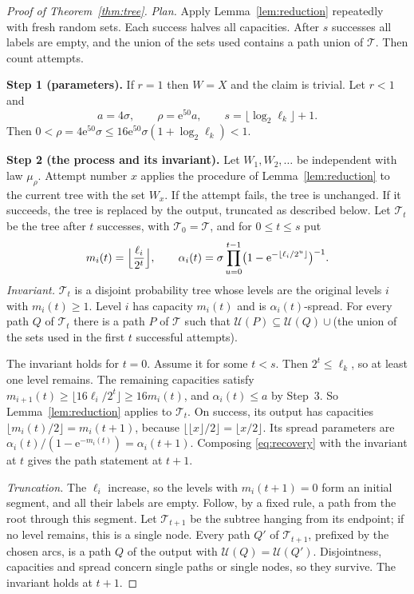 \documentclass[11pt]{article}
\numberwithin{equation}{section}
\newcommand{\TT}{\mathcal T}
\newcommand{\UU}{\mathcal U}
\newcommand{\ee}{\mathrm e}
\newcommand{\Step}[1]{\par\smallskip\noindent\textbf{Step #1.}}
\begin{document}
\begin{proof}[Proof of Theorem~\ref{thm:tree}]
\emph{Plan.} Apply Lemma~\ref{lem:reduction} repeatedly with fresh random sets.
Each success halves all capacities. After $s$ successes all labels are empty,
and the union of the sets used contains a path union of $\TT$. Then count
attempts.

\Step{1 (parameters)} If $r=1$ then $W=X$ and the claim is trivial. Let $r<1$ and
\[
 a=4\sigma,\qquad \rho=\ee^{50}a,\qquad s=\lfloor\log_2\ell_k\rfloor+1 .
\]
Then $0<\rho=4\ee^{50}\sigma\le16\ee^{50}\sigma(1+\log_2\ell_k)<1$.

\Step{2 (the process and its invariant)} Let $W_1,W_2,\ldots$ be independent
with law $\mu_\rho$. Attempt number $x$ applies the procedure of
Lemma~\ref{lem:reduction} to the current tree with the set $W_x$. If the
attempt fails, the tree is unchanged. If it succeeds, the tree is replaced by
the output, truncated as described below. Let $\TT_t$ be the tree after $t$
successes, with $\TT_0=\TT$, and for $0\le t\le s$ put
\begin{equation}\label{eq:capacities}
 m_i(t)=\Bigl\lfloor\frac{\ell_i}{2^t}\Bigr\rfloor,\qquad
 \alpha_i(t)=\sigma\prod_{u=0}^{t-1}
 \bigl(1-\ee^{-\lfloor\ell_i/2^u\rfloor}\bigr)^{-1}.
\end{equation}
\emph{Invariant.} $\TT_t$ is a disjoint probability tree whose levels are the
original levels $i$ with $m_i(t)\ge1$. Level $i$ has capacity $m_i(t)$ and is
$\alpha_i(t)$-spread. For every path $Q$ of $\TT_t$ there is a path $P$ of
$\TT$ such that $\UU(P)\subseteq\UU(Q)\cup{}$(the union of the sets used in the
first $t$ successful attempts).

The invariant holds for $t=0$. Assume it for some $t<s$. Then $2^t\le\ell_k$,
so at least one level remains. The remaining capacities satisfy
$m_{i+1}(t)\ge\lfloor16\ell_i/2^t\rfloor\ge16m_i(t)$, and
$\alpha_i(t)\le a$ by Step~3. So Lemma~\ref{lem:reduction} applies to $\TT_t$.
On success, its output has capacities $\lfloor m_i(t)/2\rfloor=m_i(t+1)$,
because $\lfloor\lfloor x\rfloor/2\rfloor=\lfloor x/2\rfloor$. Its spread
parameters are $\alpha_i(t)/(1-\ee^{-m_i(t)})=\alpha_i(t+1)$. Composing
\eqref{eq:recovery} with the invariant at $t$ gives the path statement at $t+1$.

\emph{Truncation.} The $\ell_i$ increase, so the levels with $m_i(t+1)=0$ form
an initial segment, and all their labels are empty. Follow, by a fixed rule, a
path from the root through this segment. Let $\TT_{t+1}$ be the subtree hanging
from its endpoint; if no level remains, this is a single node. Every path $Q'$
of $\TT_{t+1}$, prefixed by the chosen arcs, is a path $Q$ of the output with
$\UU(Q)=\UU(Q')$. Disjointness, capacities and spread concern single paths or
single nodes, so they survive. The invariant holds at $t+1$.


\end{proof}
\end{document}
